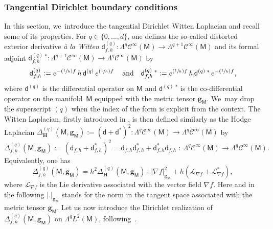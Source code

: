 \documentclass[10pt]{amsart}
\newcommand{\Psfrac}[2]{(\sfrac{#1}{#2})}
\newcommand{\quand}{\quad\text{and}\quad}
\newcommand{\mbf}[1]{\mathbf{#1}}
\theoremstyle{plain}
\theoremstyle{definition}
\begin{document}
\subsubsection{Tangential Dirichlet boundary conditions}
\label{sec:LD}
In this section, we~introduce the tangential Dirichlet Witten Laplacian and recall some of its properties.
For $q\in\{0,\dots,d\}$, one defines the so-called distorted exterior
derivative \textit{\`a la Witten} $\mathsf d_{f,h}^{(q)}:\Lambda^{q}
\mathcal C^{\infty}(\mathsf M)\to \Lambda^{q+1} \mathcal
C^{\infty}(\mathsf M)$ and its formal adjoint
$\mathsf d_{f,h}^{(q)} \,^{*}:\Lambda^{q+1} \mathcal
C^{\infty}(\mathsf M)\to \Lambda^{q} \mathcal C^{\infty}(\mathsf M)$ by
\[
\mathsf d_{f,h}^{(q)}:= e^{-\Psfrac{1}{h}f}\, h\, \mathsf d^{(q)} \, e^{\Psfrac{1}{h}f} \, \quand \mathsf d_{f,h}^{(q)}\,^{*}:= e^{\Psfrac{1}{h}f}\,h\,\mathsf d^{(q)}\,^{*}\,e^{-\Psfrac{1}{h}f},
\]
where $\mathsf d^{(q)}$ is the differential operator on $\mathsf M$
and $\mathsf d^{(q)}\,^{*}$ is the co-differential operator on the
manifold~$\mathsf M$ equipped with the metric tensor $\mbf g_{\mathsf
M}$. We~may drop the superscript $(q)$ when the index of the form is
explicit from the context.
The Witten Laplacian, firstly introduced in \cite{witten-82},
is then defined similarly as the Hodge Laplacian $\Delta^{(q)}_{\mbf
H}(\mathsf M,\mbf g_{\mathsf M}):=(\mathsf d+\mathsf
d^*)^2:\Lambda^{q} \mathcal C^{\infty}(\mathsf M)\to \Lambda^{q}
\mathcal C^{\infty}(\mathsf M)$ by
\[
\Delta_{f,h}^{(q)} (\mathsf M,\mbf g_{\mathsf M}):= (\mathsf d_{f,h}+ \mathsf d_{f,h}^*)^2= \mathsf d_{f,h}\mathsf d^{*}_{f,h}+\mathsf d^{*}_{f,h}\mathsf d_{f,h}\;:\ \Lambda^{q} \mathcal C^{\infty}(\mathsf M)\to \Lambda^{q} \mathcal C^{\infty}(\mathsf M).
\]
Equivalently, one has
\begin{equation}\label{dec.delta}
\Delta_{f,h}^{(q)} (\mathsf M,\mbf g_{\mathsf M})=h^2\Delta_{\mbf H}^{(q)}(\mathsf M,\mbf g_{\mathsf M})+\vert \nabla f \vert_{\mbf g_{\mathsf M}}^2+h(\mathcal L_{\nabla f} + \mathcal L_{\nabla f}^*),
\end{equation}
where $\mathcal L_{\nabla f}$ is the Lie derivative associated with
the vector field ${\nabla f}$. Here and in the following $\vert. \vert_{\mbf g_{\mathsf M}} $ stands for the norm in the
tangent space associated with the metric tensor $\mbf g_{\mathsf M}$.
Let us now introduce the Dirichlet realization of
$\Delta_{f,h}^{(q)}(\mathsf M,\mbf g_{\mathsf M})$ on $\Lambda^{q}
L^{2}(\mathsf M)$, following~\cite[\S2.4]{helffer-nier-06}.
\end{document}
